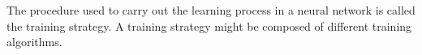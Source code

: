 The procedure used to carry out the learning process in a neural network is called the
training strategy. A training strategy might be composed of different training algorithms. 


